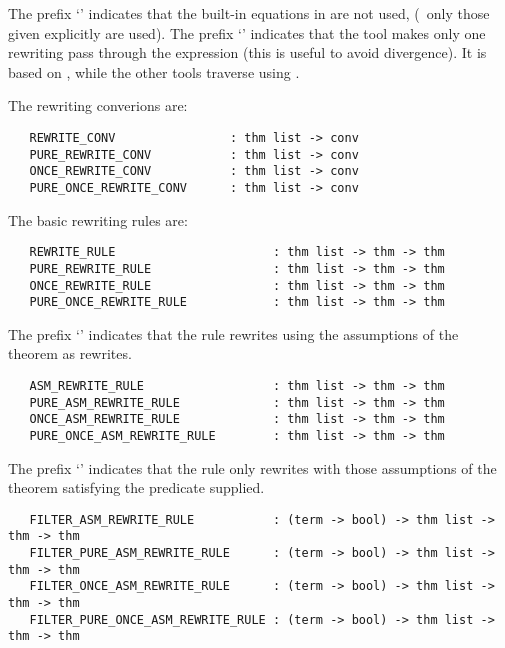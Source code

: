 The prefix `' indicates
that the built-in equations in  are not used, 
(\ie\ only those
given explicitly are used).  The prefix `' indicates that the 
tool 
makes only one rewriting pass through the expression
(this is useful to avoid divergence). It is based on ,
while the other tools traverse using .

The rewriting converions are:

\begin{hol}\begin{verbatim}
   REWRITE_CONV                : thm list -> conv
   PURE_REWRITE_CONV           : thm list -> conv
   ONCE_REWRITE_CONV           : thm list -> conv
   PURE_ONCE_REWRITE_CONV      : thm list -> conv
\end{verbatim}\end{hol}

The basic rewriting rules are:

\begin{hol}\begin{verbatim}
   REWRITE_RULE                      : thm list -> thm -> thm
   PURE_REWRITE_RULE                 : thm list -> thm -> thm
   ONCE_REWRITE_RULE                 : thm list -> thm -> thm
   PURE_ONCE_REWRITE_RULE            : thm list -> thm -> thm
\end{verbatim}\end{hol}

\noindent The prefix `' 
indicates that the rule rewrites using the assumptions
of the theorem as rewrites.

\begin{hol}\begin{verbatim}
   ASM_REWRITE_RULE                  : thm list -> thm -> thm
   PURE_ASM_REWRITE_RULE             : thm list -> thm -> thm
   ONCE_ASM_REWRITE_RULE             : thm list -> thm -> thm
   PURE_ONCE_ASM_REWRITE_RULE        : thm list -> thm -> thm
\end{verbatim}\end{hol}

\noindent The prefix `'
indicates that the rule only rewrites with
those assumptions of the theorem satisfying the predicate supplied.

\begin{hol}\begin{verbatim}
   FILTER_ASM_REWRITE_RULE           : (term -> bool) -> thm list -> thm -> thm
   FILTER_PURE_ASM_REWRITE_RULE      : (term -> bool) -> thm list -> thm -> thm
   FILTER_ONCE_ASM_REWRITE_RULE      : (term -> bool) -> thm list -> thm -> thm
   FILTER_PURE_ONCE_ASM_REWRITE_RULE : (term -> bool) -> thm list -> thm -> thm
\end{verbatim}\end{hol}

